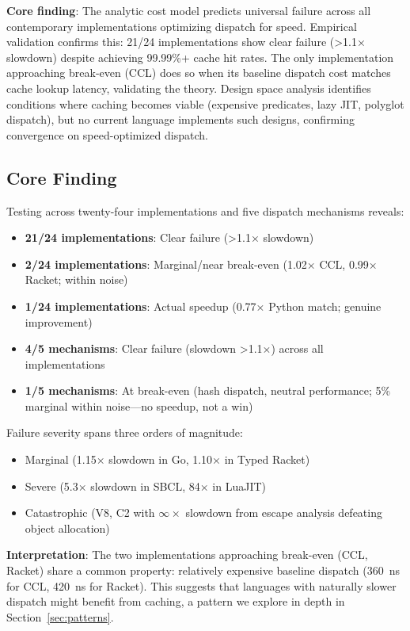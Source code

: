 \documentclass[sigplan,final,acmsmall,review,screen]{acmart}
\begin{document}
  \textbf{Core finding}: The analytic cost model predicts universal failure across all contemporary implementations optimizing dispatch for speed.
Empirical validation confirms this: 21/24 implementations show clear failure (>1.1× slowdown) despite achieving 99.99\%+ cache hit rates.
The only implementation approaching break-even (CCL) does so when its baseline dispatch cost matches cache lookup latency,
validating the theory. Design space analysis identifies conditions where caching becomes viable (expensive predicates, lazy JIT, polyglot dispatch),
but no current language implements such designs, confirming convergence on speed-optimized dispatch.

\subsection{Core Finding}

Testing across twenty-four implementations and five dispatch mechanisms reveals:
\begin{itemize}
  \item \textbf{21/24 implementations}: Clear failure (>1.1× slowdown)
  \item \textbf{2/24 implementations}: Marginal/near break-even (1.02× CCL, 0.99× Racket; within noise)
  \item \textbf{1/24 implementations}: Actual speedup (0.77× Python match; genuine improvement)
  \item \textbf{4/5 mechanisms}: Clear failure (slowdown >1.1×) across all implementations
  \item \textbf{1/5 mechanisms}: At break-even (hash dispatch, neutral performance; 5\% marginal within noise—no speedup, not a win)
\end{itemize}

Failure severity spans three orders of magnitude:
\begin{itemize}
  \item Marginal (1.15× slowdown in Go, 1.10× in Typed Racket)
  \item Severe (5.3× slowdown in SBCL, 84× in LuaJIT)
  \item Catastrophic (V8, C2 with $\infty \times$ slowdown from escape analysis defeating object allocation)
\end{itemize}

\textbf{Interpretation}: The two implementations approaching break-even (CCL, Racket) share a common property: relatively expensive
baseline dispatch (360~ns for CCL, 420~ns for Racket). This suggests that languages with naturally slower dispatch might benefit from caching,
a pattern we explore in depth in Section~\ref{sec:patterns}.
\end{document}
